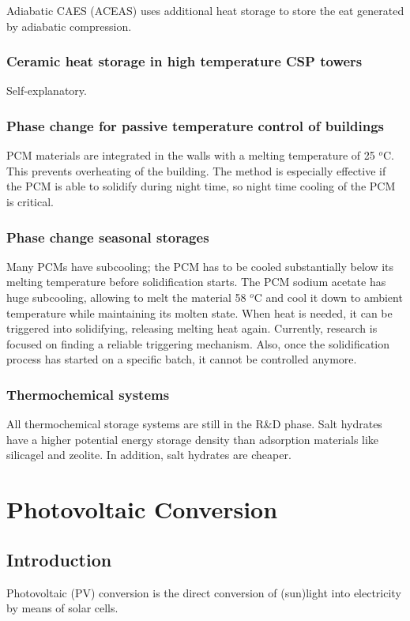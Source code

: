 \documentclass[a4paper,10pt]{article}
\begin{document}
Adiabatic CAES (ACEAS) uses additional heat storage to store the eat generated by adiabatic compression.

\subsubsection{Ceramic heat storage in high temperature CSP towers}
Self-explanatory.

\subsubsection{Phase change for passive temperature control of buildings}
PCM materials are integrated in the walls with a melting temperature of 25 $^o$C. This prevents overheating of the building. The method is especially effective if the PCM is able to solidify during night time, so night time cooling of the PCM is critical.

\subsubsection{Phase change seasonal storages}
Many PCMs have subcooling; the PCM has to be cooled substantially below its melting temperature before solidification starts. The PCM sodium acetate has huge subcooling, allowing to melt the material 58 $^o$C and cool it down to ambient temperature while maintaining its molten state. When heat is needed, it can be triggered into solidifying, releasing melting heat again. Currently, research is focused on finding a reliable triggering mechanism. Also, once the solidification process has started on a specific batch, it cannot be controlled anymore.

\subsubsection{Thermochemical systems}
All thermochemical storage systems are still in the R\&D phase. Salt hydrates have a higher potential energy storage density than adsorption materials like silicagel and zeolite. In addition, salt hydrates are cheaper. 


\section{Photovoltaic Conversion}
\subsection{Introduction}
Photovoltaic (PV) conversion is the direct conversion of (sun)light into electricity by means of solar cells.
\end{document}
